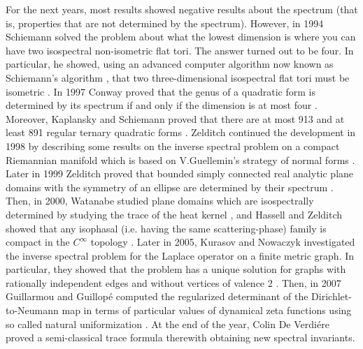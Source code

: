 \documentclass{amsart}
\theoremstyle{definition}
\begin{document}
For the next years, most results showed negative results about the spectrum (that is, properties that are not determined by the spectrum). However, in 1994 Schiemann solved the problem about what the lowest dimension is where you can have two isospectral non-isometric flat tori. The answer turned out to be four. In particular, he showed, using an advanced computer algorithm now known as Schiemann's algorithm \cite{nilsson2022isospectral}, that two three-dimensional isospectral flat tori must be isometric \cite{schiemann1994ternare}. In 1997 Conway proved that the genus of a quadratic form is determined by its spectrum if and only if the dimension is at most four \cite{conway1997sensual}. Moreover, Kaplansky and Schiemann proved that there are at most 913 and at least 891 regular ternary quadratic forms \cite{jagy1997there}. Zelditch continued the development in 1998 by describing some results on the inverse spectral problem on a compact Riemannian manifold which is based on V.Guellemin's strategy of normal forms \cite{zelditch1998normal}. Later in 1999 Zelditch proved that bounded simply connected real analytic plane domains with the symmetry of an ellipse are determined by their spectrum \cite{zelditch1999spectral}. Then, in 2000, Watanabe studied plane domains which are isospectrally determined by studying the trace of the heat kernel \cite{watanabe2000plane}, and Hassell and Zelditch showed that any isophasal (i.e. having the same scattering-phase) family is compact in the $C^\infty$ topology \cite{hassell2000determinants}. Later in 2005, Kurasov and Nowaczyk investigated the inverse spectral problem for the Laplace operator on a finite metric graph. In particular, they showed that the problem has a unique solution for graphs with rationally independent edges and without vertices of valence 2 \cite{kurasov2005inverse}. Then, in 2007 Guillarmou and Guillopé computed the regularized determinant of the Dirichlet-to-Neumann map in terms of particular values of dynamical zeta functions using so called natural uniformization \cite{guillarmou2007determinant}. At the end of the year, Colin De Verdiére proved a semi-classical trace formula \cite{colin2007spectrum} therewith obtaining new spectral invariants.
\end{document}
